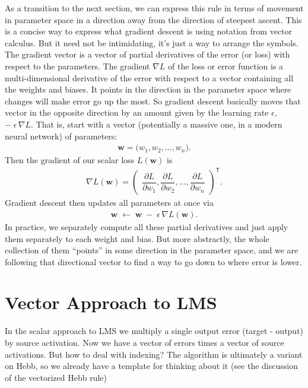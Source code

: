 As a transition to the next section, we can express this rule in terms of movement in parameter space in a direction away from the direction of steepest ascent.  This is a concise way to express what gradient descent is using notation from vector calculus. But it need not be intimidating, it's just a way to arrange the symbols. The gradient vector is a vector of partial derivatives of the error (or loss) with respect to the parameters. The gradient $\nabla L$ of the loss or error function is a multi-dimensional derivative of the error with respect to a vector containing all the weights and biases. It points in the direction in the parameter space where changes will make error go up the most.  So gradient descent basically moves that vector in the opposite direction by an amount given by the learning rate $\epsilon$,  $-\;\epsilon\,\nabla L$. That is, start with a vector (potentially a massive one, in a modern neural network) of parameters:
\begin{eqnarray*}
  \mathbf{w} = \bigl(w_1, w_2, \dots, w_n\bigr).
\end{eqnarray*}
Then the gradient of our scalar loss \(L(\mathbf{w})\) is
\begin{eqnarray*}
  \nabla L(\mathbf{w})
    = \begin{pmatrix}
        \dfrac{\partial L}{\partial w_1}, 
        \dfrac{\partial L}{\partial w_2}, 
        \dots, 
        \dfrac{\partial L}{\partial w_n}
      \end{pmatrix}^\mathsf{T}.
\end{eqnarray*}
Gradient descent then updates all parameters at once via
\begin{eqnarray*}
  \mathbf{w} \;\leftarrow\; \mathbf{w} \;-\;\epsilon\,\nabla L(\mathbf{w}).
\end{eqnarray*}
In practice, we separately compute all these partial derivatives and just apply them separately to each weight and bias. But more abstractly, the whole collection of them ``points'' in some direction in the parameter space, and we are following that directional vector to find a way to go down to where error is lower.

\section{Vector Approach to LMS}

In the scalar approach to LMS we multiply a single output error (target - output) by source activation. Now we have a vector of errors times a vector of source activations. But how to deal with indexing?  The algorithm is ultimately a variant on Hebb, so we already have a template for thinking about it (see the discussion of the vectorized Hebb rule)

